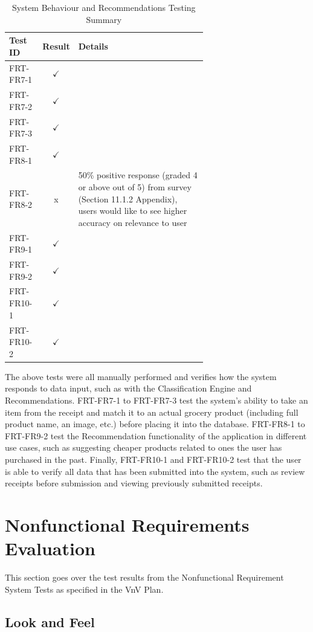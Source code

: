 \documentclass[12pt, titlepage]{article}
\begin{document}
\begin{longtable}{|l|c|p{0.65\linewidth}|}
  \caption{System Behaviour and Recommendations Testing Summary} \label{System Behaviour and Recommendations Testing Summary} \\
  \toprule
  \textbf{Test ID} & \textbf{Result} & \textbf{Details} \\
  \midrule
  FRT-FR7-1 & $\checkmark$ & \\
  \midrule
  FRT-FR7-2 & $\checkmark$ & \\
  \midrule
  FRT-FR7-3 & $\checkmark$ & \\
  \midrule
  FRT-FR8-1 & $\checkmark$ & \\
  \midrule
  FRT-FR8-2 & x & 50\% positive response (graded 4 or above out of 5) from survey (Section 11.1.2 Appendix), users would like to see higher accuracy on relevance to user \\
  \midrule
  FRT-FR9-1 & $\checkmark$ & \\
  \midrule
  FRT-FR9-2 & $\checkmark$ & \\
  \midrule
  FRT-FR10-1 & $\checkmark$ & \\
  \midrule
  FRT-FR10-2 & $\checkmark$ & \\
  \bottomrule
\end{longtable}

The above tests were all manually performed and verifies how the system responds to data input, such
as with the Classification Engine and Recommendations. FRT-FR7-1 to FRT-FR7-3 test the system's ability
to take an item from the receipt and match it to an actual grocery product (including full product name, an image, etc.)
before placing it into the database. FRT-FR8-1 to FRT-FR9-2 test the Recommendation functionality of the
application in different use cases, such as suggesting cheaper products related to ones the user has purchased
in the past. Finally, FRT-FR10-1 and FRT-FR10-2 test that the user is able to verify all data that has been
submitted into the system, such as review receipts before submission and viewing previously submitted receipts.

\section{Nonfunctional Requirements Evaluation}

This section goes over the test results from the Nonfunctional Requirement System Tests as
specified in the VnV Plan.

\subsection{Look and Feel}
\end{document}
